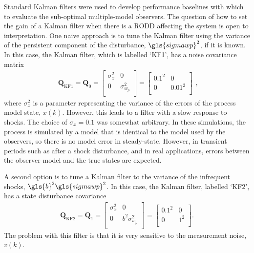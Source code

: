 Standard Kalman filters were used to develop performance baselines with which to evaluate the sub-optimal multiple-model observers. The question of how to set the gain of a Kalman filter when there is a \gls{RODD} affecting the system is open to interpretation. One naive approach is to tune the Kalman filter using the variance of the persistent component of the disturbance, $\gls{sigmawp}^2$, if it is known. In this case, the Kalman filter, which is labelled `KF1', has a noise covariance matrix
\begin{equation} \label{eq:sim-sys-siso-KF1-Q}
	\begin{aligned}
		\mathbf{Q}_{\text{KF1}}=\mathbf{Q}_0=\begin{bmatrix}
			\sigma_{x}^2 & 0 \\
			0 &  \sigma_{w_p}^2 \\
		\end{bmatrix}=\begin{bmatrix}
		0.1^2 & 0 \\
		0 & 0.01^2 \\
	\end{bmatrix}
	\end{aligned},
\end{equation}
where $\sigma_{x}^2$ is a parameter representing the variance of the errors of the process model state, $x(k)$. However, this leads to a filter with a slow response to shocks. The choice of $\sigma_{x}=0.1$ was somewhat arbitrary. In these simulations, the process is simulated by a model that is identical to the model used by the observers, so there is no model error in steady-state. However, in transient periods such as after a shock disturbance, and in real applications, errors between the observer model and the true states are expected.

A second option is to tune a Kalman filter to the variance of the infrequent shocks, $\gls{b}^2\gls{sigmawp}^2$.  In this case, the Kalman filter, labelled `KF2', has a state disturbance covariance
\begin{equation} \label{eq:sim-sys-siso-KF2-Q}
	\begin{aligned}
		\mathbf{Q}_{\text{KF2}}=\mathbf{Q}_1=\begin{bmatrix}
			\sigma_{x}^2 & 0 \\
			0 & b^2\sigma_{w_p}^2 \\
		\end{bmatrix}=\begin{bmatrix}
			0.1^2 & 0 \\
			0 & 1^2 \\
		\end{bmatrix}.
	\end{aligned}
\end{equation}
The problem with this filter is that it is very sensitive to the measurement noise, $v(k)$. 

